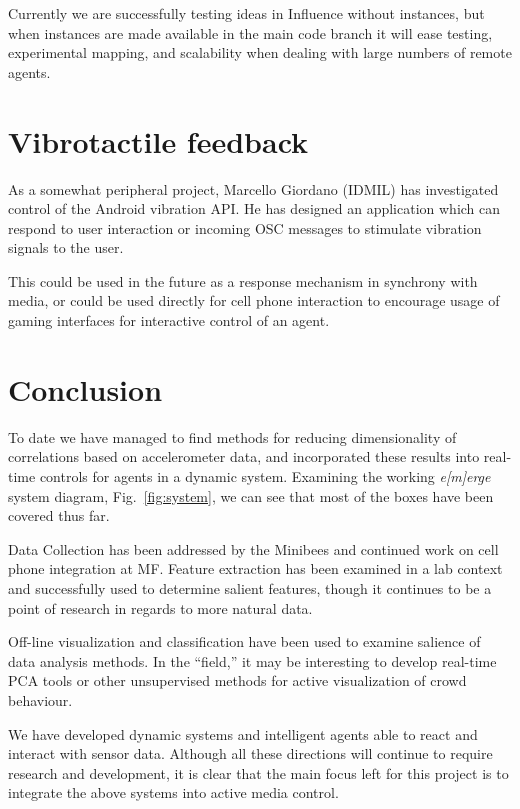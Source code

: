 \documentclass{article}
\newcommand{\emerge}{\emph{e[m]erge}\xspace}
\begin{document}
Currently we are successfully testing ideas in Influence without
instances, but when instances are made available in the main code
branch it will ease testing, experimental mapping, and scalability
when dealing with large numbers of remote agents.

\section{Vibrotactile feedback}

As a somewhat peripheral project, Marcello Giordano (IDMIL) has
investigated control of the Android vibration API.
He has designed an application which can respond to user interaction
or incoming OSC messages to stimulate vibration signals to the user.

This could be used in the future as a response mechanism in synchrony
with media, or could be used directly for cell phone interaction to
encourage usage of gaming interfaces for interactive control of an
agent.

\section{Conclusion}

To date we have managed to find methods for reducing dimensionality of
correlations based on accelerometer data, and incorporated these
results into real-time controls for agents in a dynamic system.
Examining the working \emerge system diagram, Fig.~\ref{fig:system},
we can see that most of the boxes have been covered thus far.

Data Collection has been addressed by the Minibees and continued work
on cell phone integration at MF.
Feature extraction has been examined in a lab context and successfully
used to determine salient features, though it continues to be a point
of research in regards to more natural data.

Off-line visualization and classification have been used to examine
salience of data analysis methods.
In the ``field,'' it may be interesting to develop real-time PCA tools
or other unsupervised methods for active visualization of crowd
behaviour.

We have developed dynamic systems and intelligent agents able to react
and interact with sensor data.
Although all these directions will continue to require research and
development, it is clear that the main focus left for this project is
to integrate the above systems into active media control.
\end{document}
